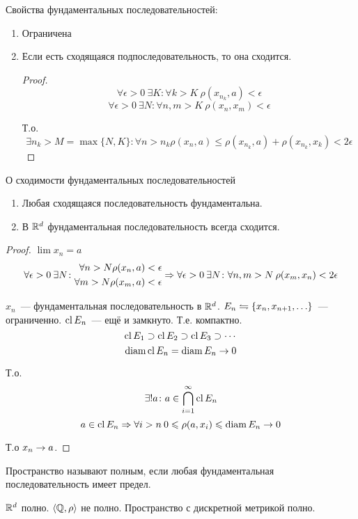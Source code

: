 ﻿Свойства фундаментальных последовательностей:
\begin{enumerate}
\item Ограничена
\item Если есть сходящаяся подпоследовательность, то она сходится.
\begin{proof}
$$\forall \epsilon > 0\: \exists K\colon \forall k > K\: \rho(x_{n_k}, a) < \epsilon$$
$$\forall \epsilon > 0\: \exists N\colon \forall n,m > K\: \rho(x_n, x_m) < \epsilon$$

Т.о.
$$\exists n_k > M = \max\{N, K\}\colon \forall n > n_k \rho(x_n, a) \leqslant \rho(x_{n_k}, a) + \rho(x_{n_k}, x_k) < 2\epsilon$$
\end{proof}
\end{enumerate}

\begin{theorem}{О сходимости фундаментальных последовательностей}
\begin{enumerate}
\item Любая сходящаяся последовательность фундаментальна.
\item В $\mathbb{R}^d$ фундаментальная последовательность всегда сходится.
\end{enumerate}
\end{theorem}
\begin{proof}
$\lim x_n = a$
$$\forall \epsilon > 0\: \exists N\colon \begin{aligned}\forall n>N \rho(x_n, a) &< \epsilon \\ \forall m>N \rho(x_m, a) &< \epsilon\end{aligned} \Rightarrow \forall \epsilon>0\: \exists N\colon \forall n,m>N\: \rho(x_m, x_n) < 2\epsilon$$

$x_n$~--- фундаментальная последовательность в $\mathbb{R}^d$. $E_n \leftrightharpoons \{x_n, x_{n+1}, \ldots\}$~--- ограниченно.
$\operatorname{cl} E_n$~--- ещё и замкнуто. Т.е. компактно.
$$\operatorname{cl} E_1 \supset \operatorname{cl} E_2 \supset \operatorname{cl} E_3 \supset \cdots$$
$$\operatorname{diam} \operatorname{cl} E_n = \operatorname{diam} E_n \rightarrow 0$$

Т.о.
$$\exists! a\colon a \in \bigcap_{i=1}^{\infty} \operatorname{cl} E_n$$
$$a \in \operatorname{cl} E_n \Rightarrow \forall i>n\:0\leqslant\rho(a, x_i) \leqslant \operatorname{diam} E_n \rightarrow 0$$

Т.о $x_n \rightarrow a$.
\end{proof}

\begin{Def}
Пространство называют полным, если любая фундаментальная последовательность имеет предел.
\end{Def}                                       
\begin{Rem}
$\mathbb{R}^d$ полно. $\left<\mathbb{Q}, \rho\right>$ не полно. Пространство с дискретной метрикой полно.
\end{Rem}

